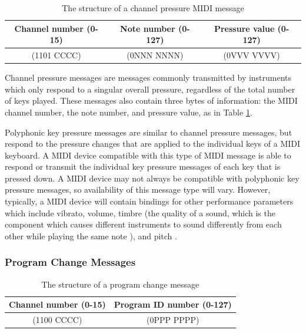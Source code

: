 \begin{table}
	\centering
	\begin{tabular}{|c|c|c|}
	\hline
		Channel number (0-15) & Note number (0-127) & Pressure value (0-127) \\
		\hline
		(1101 CCCC) & (0NNN NNNN) & (0VVV VVVV) \\
	\hline
	\end{tabular}
	\caption{The structure of a channel pressure MIDI message}
	\label{tbl:byte-structure-channel-pressure-messages}
\end{table}

Channel pressure messages are messages commonly transmitted by instruments which only respond to a singular overall pressure, regardless of the total number of keys played. These messages also contain three bytes of information: the MIDI channel number, the note number, and pressure value, as in Table \ref{tbl:byte-structure-channel-pressure-messages}\cite{Huber_2012}. 

Polyphonic key pressure messages are similar to channel pressure messages, but respond to the pressure changes that are applied to the individual keys of a MIDI keyboard. A MIDI device compatible with this type of MIDI message is able to respond or transmit the individual key pressure messages of each key that is pressed down. A MIDI device may not always be compatible with polyphonic key pressure messages, so availability of this message type will vary. However, typically, a MIDI device will contain bindings for other performance parameters which include vibrato, volume, timbre (the quality of a sound, which is the component which causes different instruments to sound differently from each other while playing the same note \cite{Burkholder_Grout_Palisca_2014}), and pitch \cite{McGuire_2014}. 

\subsubsection{Program Change Messages}

\begin{table}
	\centering
	\begin{tabular}{|c|c|}
	\hline
		Channel number (0-15) & Program ID number (0-127) \\
		\hline
		(1100 CCCC) & (0PPP PPPP) \\
	\hline
	\end{tabular}
	\caption{The structure of a program change message}
	\label{tbl:byte-structure-program-change}
\end{table}

